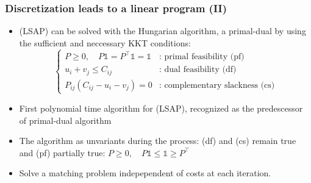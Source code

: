 \documentclass{beamer}
\newcommand{\un}{\mathds{1}}
\begin{document}
\begin{frame}  
    \frametitle{Discretization leads to a linear program (II)}
    \begin{itemize}
    \item (LSAP) can be solved with the Hungarian algorithm, a primal-dual by using the sufficient and neccessary KKT conditions:
    \begin{equation*}
    \begin{cases}
    P \geq 0,\quad P\un = P^\top\un = \un & \text{: primal feasibility} \text{ (pf)}  \\
    u_i + v_j \leq C_{ij}  & \text{: dual feasibility}  \text{ (df)} \\
    P_{ij}(C_{ij} - u_i - v_j) = 0  &\text{: complementary slackness} \text{ (cs)}
    \end{cases}
    \end{equation*}
    \item First polynomial time algorithm for (LSAP), recognized as the predescessor of primal-dual algorithm
    \item The algorithm as unvariants during the process: (df) and (cs) remain true and (pf) partially true:  $P \geq 0,\quad P\un \leq \un \geq P^\top$
    \item Solve a matching problem indepependent of costs at each iteration.
    \end{itemize}
\end{frame}
\end{document}
